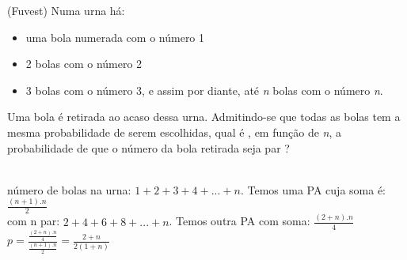 \begin{ex}
 (Fuvest) Numa urna há:
   \begin{itemize}
   \item uma bola numerada com o número 1
   \item 2 bolas com o número 2
   \item 3 bolas com o número 3, e assim por diante, até \textit{n} bolas com o número \textit{n}.
   \end{itemize}
Uma bola é retirada ao acaso dessa urna. Admitindo-se que todas as bolas tem a mesma probabilidade de serem escolhidas, qual é , em função de \textit{n}, a probabilidade de que o número da bola retirada seja par ?
 \begin{sol}
   \phantom{A} \\
   número de bolas na urna: $1+2+3+4+...+n$. Temos uma PA cuja soma é: $\frac{(n+1).n}{2}$\\
   com n par: $2+4+6+8+...+n$. Temos outra PA com soma: $\frac{(2+n).n}{4}$ \\
   $p=\frac{\frac{(2+n).n}{4}}{\frac{(n+1).n}{2}}=\frac{2+n}{2(1+n)}$
   
 \end{sol}
\end{ex}